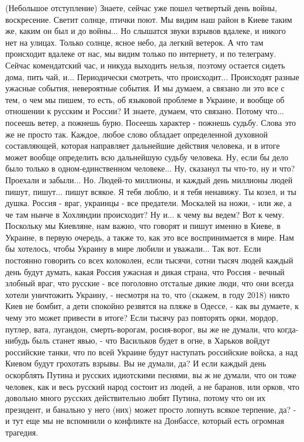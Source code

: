 (Небольшое отступление) Знаете, сейчас уже пошел четвертый день войны,
воскресение. Светит солнце, птички поют. Мы видим наш район в Киеве таким же,
каким он был и до войны...  Но слышатся звуки взрывов вдалеке, и никого нет на
улицах. Только солнце, ясное небо, да легкий ветерок.  А что там происходит
вдалеке от нас, мы видим только по интернету, и по телеграму.  Сейчас
комендатский час, и никуда выходить нельзя, поэтому остается сидеть дома, пить
чай, и...  Периодически смотреть, что происходит...  Происходят разные ужасные
события, невероятные события. И мы думаем, а связано ли это все с тем, о чем мы
пишем, то есть, об языковой проблеме в Украине, и вообще об отношении к русским
и России? И знаете, думаем, что связано. Потому что...  посеешь ветер, а
пожнешь бурю. Посеешь характер - пожнешь судьбу. Слова это же не просто так.
Каждое, любое слово обладает определенной духовной составляющей, которая
направляет дальнейшие действия человека, и в итоге может вообще определить всю
дальнейшую судьбу человека. Ну, если бы дело было только в одном-единственном
человеке... Ну, сказанул ты что-то, ну и что? Проехали и забыли... Но. Людей-то
миллионы, и каждый день миллионы людей пишут, пишут...  пишут всякое. Я тебя
люблю, и я тебя ненавижу.  Ты козел, и ты душка. Россия - враг, украинцы - все
предатели. Москалей на ножи, - или же, а че там нынче в Хохляндии происходит?
Ну и... к чему вы ведем? Вот к чему. Поскольку мы Киевляне, нам важно, что
говорят и пишут именно в Киеве, в Украине, в первую очередь, а также то, как
это все воспринимается в мире. Нам бы хотелось, чтобы Украину в мире любили и
уважали... Так вот. Если постоянно говорить со всех колоколен, если тысячи,
сотни тысяч людей каждый день будут думать, какая Россия ужасная и дикая
страна, что Россия - вечный злобный враг, что русские - все поголовно отсталые
дикие люди, что они всегда хотели уничтожить Украину, - несмотря на то, что
(скажем, в году 2018) никто Киев не бомбит, а дети спокойно резвятся на пляже в
Одессе, - как вы думаете, к чему это может привести в итоге? Если тысячу раз
повторять орки, мордор, путлер, вата, лугандон, смерть-ворогам, росия-ворог, вы
же не думали, что когда-нибудь быль станет явью, - что Васильков будет в огне,
в Харьков войдут российские танки, что по всей Украине будут наступать
российские войска, а над Киевом будут грохотать взрывы. Вы не думали, да? И
если каждый день оскорблять Путина и русских идиотскими песнями, вы ж не
думали, что он тоже человек, как и весь русский народ состоит из людей, а не
баранов, или орков, что довольно много русских действительно любят Путина,
потому что он их президент, и банально у него (них) может просто лопнуть всякое
терпение, да? -  и тут еще мы не вспомнили о конфликте на Донбассе, который
есть огромная трагедия. 
